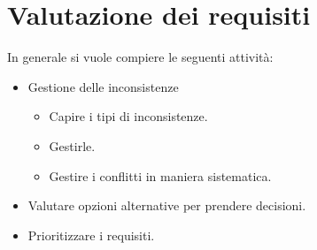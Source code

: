 \documentclass[../main.tex]{subfiles}
\begin{document}
\section{Valutazione dei requisiti}
In generale si vuole compiere le seguenti attività:
\begin{itemize}
	\item Gestione delle inconsistenze
	\begin{itemize}
		\item Capire i tipi di inconsistenze.
		\item Gestirle.
		\item Gestire i conflitti in maniera sistematica.
	\end{itemize}
	\item Valutare opzioni alternative per prendere decisioni.
	\item Prioritizzare i requisiti.
\end{itemize}
\end{document}

